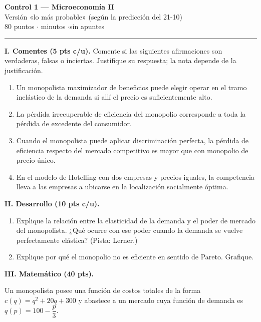 \documentclass[11pt]{article}
\begin{document}
\begin{center}
{\Large\bfseries Control 1 --- Microeconomía II}\\[4pt]
{\large Versión «lo más probable» (según la predicción del 21-10)}\\[4pt]
80 puntos \quad$\cdot$ minutos \quad$\cdot$\quad sin apuntes
\end{center}

\hrule
\medskip

\textbf{I. Comentes (5 pts c/u).} Comente si las siguientes afirmaciones son verdaderas, falsas o inciertas. Justifique su respuesta; la nota depende de la justificación.

\begin{enumerate}[leftmargin=*, itemsep=8pt]
\item Un monopolista maximizador de beneficios puede elegir operar en el tramo inelástico de la demanda si allí el precio es suficientemente alto.

\item La pérdida irrecuperable de eficiencia del monopolio corresponde a toda la pérdida de excedente del consumidor.

\item Cuando el monopolista puede aplicar discriminación perfecta, la pérdida de eficiencia respecto del mercado competitivo es mayor que con monopolio de precio único.

\item En el modelo de Hotelling con dos empresas y precios iguales, la competencia lleva a las empresas a ubicarse en la localización socialmente óptima.
\end{enumerate}

\textbf{II. Desarrollo (10 pts c/u).}

\begin{enumerate}[leftmargin=*, itemsep=8pt, resume]
\item Explique la relación entre la elasticidad de la demanda y el poder de mercado del monopolista. ¿Qué ocurre con ese poder cuando la demanda se vuelve perfectamente elástica? (Pista: Lerner.)

\item Explique por qué el monopolio no es eficiente en sentido de Pareto. Grafique.
\end{enumerate}

\textbf{III. Matemático (40 pts).}

Un monopolista posee una función de costos totales de la forma $c(q) = q^{2} + 20q + 300$ y abastece a un mercado cuya función de demanda es $q(p) = 100 - \dfrac{p}{3}$.
\end{document}
